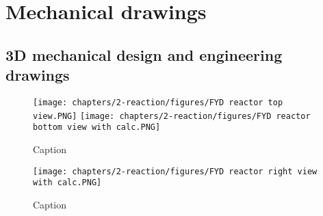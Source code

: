 \section{Mechanical drawings}
\label{app:reactor-drawings}
\subsection{3D mechanical design and engineering drawings}
\label{app:engineeringdesign}

\begin{figure}[H]
    \centering

    \texttt{[image: chapters/2-reaction/figures/FYD reactor top view.PNG]}
    \texttt{[image: chapters/2-reaction/figures/FYD reactor bottom view with calc.PNG]}
    \caption{Caption}
    \label{fig:reactorbottom}
\end{figure}

\begin{figure}
    \centering
    \texttt{[image: chapters/2-reaction/figures/FYD reactor right view with calc.PNG]}
    \caption{Caption}
    \label{fig:reactor}
\end{figure}